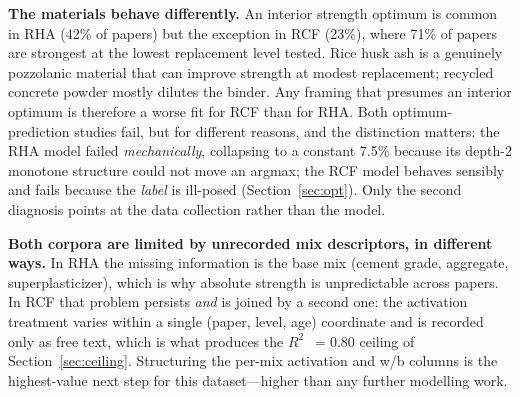 \documentclass[11pt]{article}
\newcommand{\R}{$R^2$}
\begin{document}
\textbf{The materials behave differently.} An interior strength optimum is common in
RHA (42\% of papers) but the exception in RCF (23\%), where 71\% of papers are
strongest at the lowest replacement level tested. Rice husk ash is a genuinely
pozzolanic material that can improve strength at modest replacement; recycled
concrete powder mostly dilutes the binder. Any framing that presumes an interior
optimum is therefore a worse fit for RCF than for RHA. Both optimum-prediction
studies fail, but for different reasons, and the distinction matters: the RHA model
failed \emph{mechanically}, collapsing to a constant 7.5\% because its depth-2
monotone structure could not move an argmax; the RCF model behaves sensibly and
fails because the \emph{label} is ill-posed (Section~\ref{sec:opt}). Only the second
diagnosis points at the data collection rather than the model.

\textbf{Both corpora are limited by unrecorded mix descriptors, in different ways.}
In RHA the missing information is the base mix (cement grade, aggregate,
superplasticizer), which is why absolute strength is unpredictable across papers.
In RCF that problem persists \emph{and} is joined by a second one: the activation
treatment varies within a single (paper, level, age) coordinate and is recorded only
as free text, which is what produces the \R{}~$=0.80$ ceiling of
Section~\ref{sec:ceiling}. Structuring the per-mix activation and w/b columns is the
highest-value next step for this dataset---higher than any further modelling work.
\end{document}

